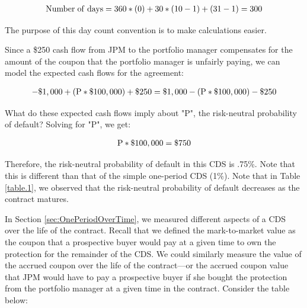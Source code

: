 \documentclass[article]{jss}
\begin{document}
\begin{equation}
 \begin{aligned}
  {\rm Number\hspace{3pt}of\hspace{3pt}days = 360 * (0) + 30 * (10 - 1) + (31 - 1) = 300}
    \end{aligned}
\end{equation}

The purpose of this day count convention is to make calculations easier.

Since a \$250 cash flow from JPM to the portfolio manager compensates for the amount of the coupon that the portfolio manager is unfairly paying, we can model the expected cash flows for the agreement:

\begin{equation}
 \begin{aligned}
   {\rm - \$1,000 + (P * \$100,000) + \$250 = \$1,000 - (P * \$100,000) - \$250}
    \end{aligned}
\end{equation}

What do these expected cash flows imply about "P", the risk-neutral probability of default? Solving for "P", we get:

\begin{equation}
 \begin{aligned}
   {\rm P * \$100,000 = \$750}
    \end{aligned}
\end{equation}

Therefore, the risk-neutral probability of default in this CDS is .75\%. Note that this is different than that of the simple one-period CDS (1\%). Note that in Table \ref{table.1}, we observed that the risk-neutral probability of default decreases as the contract matures. 

In Section \ref{sec:OnePeriodOverTime}, we measured different aspects of a CDS over the life of the contract. Recall that we defined the mark-to-market value as the coupon that a prospective buyer would pay at a given time to own the protection for the remainder of the CDS. We could similarly measure the value of the accrued coupon over the life of the contract---or the accrued coupon value that JPM would have to pay a prospective buyer if she bought the protection from the portfolio manager at a given time in the contract. Consider the table below:
\end{document}
